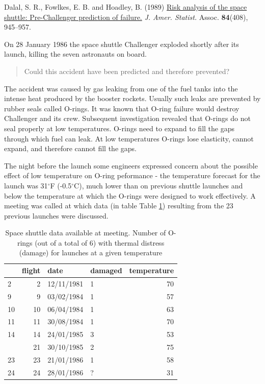 \documentclass[
  11pt,
  british,
  openany, a4paper]{book}
\begin{document}
Dalal, S. R., Fowlkes, E. B. and Hoadley, B. (1989) \href{https://moodle.ucl.ac.uk/mod/resource/view.php?id=316223}{Risk analysis of the space shuttle: Pre-Challenger prediction of failure.}
\emph{J. Amer. Statist.} Assoc. \textbf{84}(408), 945--957.

On 28 January 1986 the space shuttle Challenger exploded shortly after its launch, killing the seven astronauts on board.

\begin{quote}
Could this accident have been predicted and therefore prevented?
\end{quote}

The accident was caused by gas leaking from one of the fuel tanks into the intense heat produced by the booster rockets. Usually such leaks are prevented by rubber seals called O-rings. It was known that O-ring failure would destroy Challenger and its crew. Subsequent investigation revealed that O-rings do not seal properly at low temperatures. O-rings need to expand to fill the gaps through which fuel can leak. At low temperatures O-rings lose elasticity, cannot expand, and therefore cannot fill the gaps.

The night before the launch some engineers expressed concern about the possible effect of low temperature on O-ring peformance - the temperature forecast for
the launch was 31\(^\circ\)F (-0.5\(^\circ\)C), much lower than on previous shuttle launches and below the temperature at which the O-rings were designed to work effectively. A meeting was called at which data (in table Table \ref{tab:tabshuttle1}) resulting from the 23 previous launches were discussed.

\begin{table}

\caption{\label{tab:tabshuttle1}Space shuttle data available at meeting. Number of O-rings (out of a total of 6) with thermal distress (damage) for launches at a given temperature}
\centering
\begin{tabular}[t]{lrllr}
\toprule
  & flight & date & damaged & temperature\\
\midrule
2 & 2 & 12/11/1981 & 1 & 70\\
9 & 9 & 03/02/1984 & 1 & 57\\
10 & 10 & 06/04/1984 & 1 & 63\\
11 & 11 & 30/08/1984 & 1 & 70\\
14 & 14 & 24/01/1985 & 3 & 53\\
\addlinespace
21 & 21 & 30/10/1985 & 2 & 75\\
23 & 23 & 21/01/1986 & 1 & 58\\
24 & 24 & 28/01/1986 & ? & 31\\
\bottomrule
\end{tabular}
\end{table}
\end{document}
